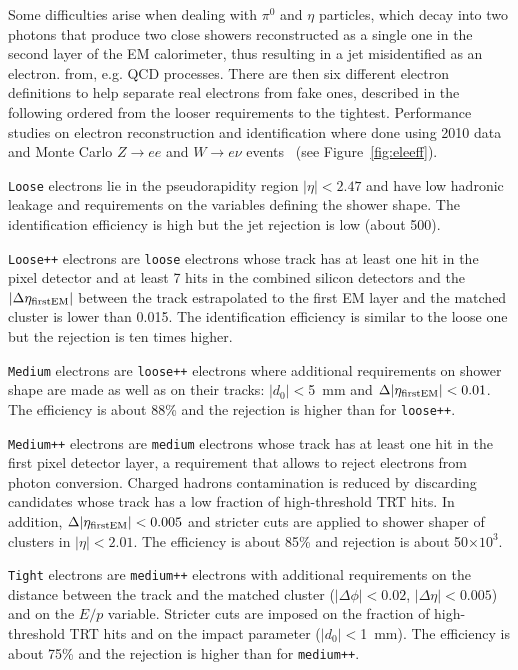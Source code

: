 Some difficulties arise when dealing with $\pi^0$ and $\eta$ particles, 
which decay into two photons that produce two close 
showers reconstructed as a single one in the second layer of the EM
calorimeter, thus resulting in a jet misidentified as an electron.
 from, e.g. QCD processes.
There are then six different electron definitions to help separate real electrons from fake ones,
described in the following ordered from the looser requirements to the tightest.
Performance studies on electron reconstruction and identification where done using 2010 data and Monte
Carlo $Z\to ee$ and $W\to e\nu$ events~\cite{eperf} (see Figure~\ref{fig:eleeff}). 

\texttt{Loose} electrons lie in the pseudorapidity region $|\eta| < 2.47$ and have 
low hadronic leakage and requirements on the variables defining the shower shape.
The identification efficiency is high but the jet rejection is low (about 500).

\texttt{Loose++} electrons are \texttt{loose} electrons whose track has at least one hit in 
the pixel detector and at least 7 hits in the combined silicon detectors and the
$|\Delta\eta_{\rm first EM}|$ between the track estrapolated to the first EM layer and
the matched cluster is lower than 0.015. The identification
efficiency is similar to the loose one but the rejection is ten times higher.

\texttt{Medium} electrons are \texttt{loose++} electrons where additional requirements on shower shape
are made as well as on their tracks: $|d_0|<$5~mm and $\Delta|\eta_{\rm first EM}|<0.01$.
The efficiency is about 88\% and the rejection is
higher than for \texttt{loose++}.

\texttt{Medium++} electrons are \texttt{medium} electrons whose track has at least one hit in the
first pixel detector layer, a requirement that allows to reject electrons from
photon conversion. Charged hadrons contamination is reduced by discarding candidates
whose track has a low fraction of high-threshold TRT hits. In addition, $\Delta|\eta_{\rm first EM}|<0.005$ 
and stricter cuts are applied to shower shaper of clusters in $|\eta|<2.01$. The
efficiency is about 85\% and rejection is about 50$\times 10^3$.

\texttt{Tight} electrons are \texttt{medium++} electrons with additional requirements on the distance
between the track and the matched cluster ($|\Delta\phi|<0.02$, $|\Delta\eta|<0.005$) and on the $E/p$
variable. Stricter cuts are imposed on the fraction of high-threshold TRT hits and on the impact parameter
($|d_0|<$1~mm). The efficiency is about 75\% and the rejection is higher than 
for \texttt{medium++}.

